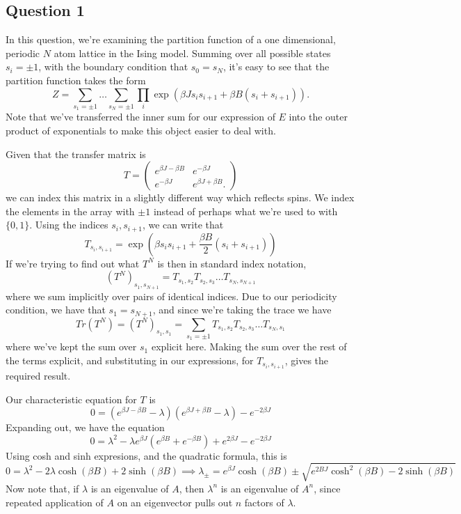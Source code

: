 \subsection{Question 1}
In this question, we're examining the partition function of a one dimensional, periodic $N$ atom lattice in the Ising model. 
Summing over all possible states $s_i = \pm 1$, with the boundary condition that $s_0 = s_N$, it's easy to see that the partition function takes the form 
\[ 
	Z = \sum_{s_1 = \pm 1} \dots \sum_{s_N = \pm 1} \prod_{i} \exp\left( \beta J s_i s_{i + 1} + \beta B (s_i + s_{i + 1}) \right). 
\]
Note that we've transferred the inner sum for our expression of $E$ into the outer product of exponentials to make this object easier to deal with. 

Given that the transfer matrix is 
\[ 
	T= \begin{pmatrix}
		e^{\beta J  - \beta B} & e^{ - \beta J} \\
		e^{ - \beta J} & e^{\beta J + \beta B}. 
	\end{pmatrix}
\]
we can index this matrix in a slightly different way which reflects spins. We index the elements in the array with ${\pm 1}$ instead of perhaps what we're used to with $\{ 0, 1\} $. Using the indices $s_i, s_{i + 1}$, we can write that 
\[ 
	T_{s_i, s_{i + 1}} = \exp \left (\beta s_{i} s_{i + 1} + \frac{\beta B}{2} (s_i + s_{i + 1}) \right) 
 \] 
 If we're trying to find out what $T^N$ is then in standard index notation, 
 \[ 
 	\left(  T^N \right)_{s_{1}, s_{N + 1}}= T_{s_1, s_2} T_{s_2, s_{3}} \dots T_{s_N, s_{N + 1}}
 \] 
 where we sum implicitly over pairs of identical indices. 
 Due to our periodicity condition, we have that $s_1= s_{N + 1}$, and since we're taking the trace we have 
 \[ 
 	Tr (T^N) = \left( T^N \right)_{s_1, s_1} = \sum_{s_1 = \pm 1} T_{s_1, s_2} T_{s_2, s_{3}} \dots T_{s_N, s_{1}}
 \] 
where we've kept the sum over $s_1$ explicit here. Making the sum over the rest of the terms explicit, and substituting in our expressions, for $T_{s_i, s_{i + 1}}$, gives the required result. 

Our characteristic equation for $ T $ is 
 \[
	 0 = ( e^{ \beta J - \beta B } - \lambda )( e^{\beta J + \beta B } - \lambda ) - e^{  - 2 \beta J }
\] Expanding out, we have the equation
\[
	0 = \lambda^ 2 - \lambda e^{ \beta J } ( e^{ \beta B } + e ^{ - \beta B } ) + e^{ 2\beta J }  - e^{  - 2 \beta J }
\] Using cosh and sinh expresions, and the quadratic formula, this is 
\[
	0 = \lambda^ 2 - 2 \lambda \cosh ( \beta B ) + 2 \sinh ( \beta B ) \implies \lambda_\pm = e^{ \beta J }\cosh ( \beta B ) \pm \sqrt{ e ^{ 2 B J } \cosh^ 2 ( \beta B ) - 2 \sinh ( \beta B ) } 
\] Now note that, if $ \lambda  $ is an eigenvalue of $ A$, then  $ \lambda^ n $ is an 
eigenvalue of  $ A^ n $, since repeated application of  $A $ on an
eigenvector pulls out  $n $ factors of $ \lambda $. 

